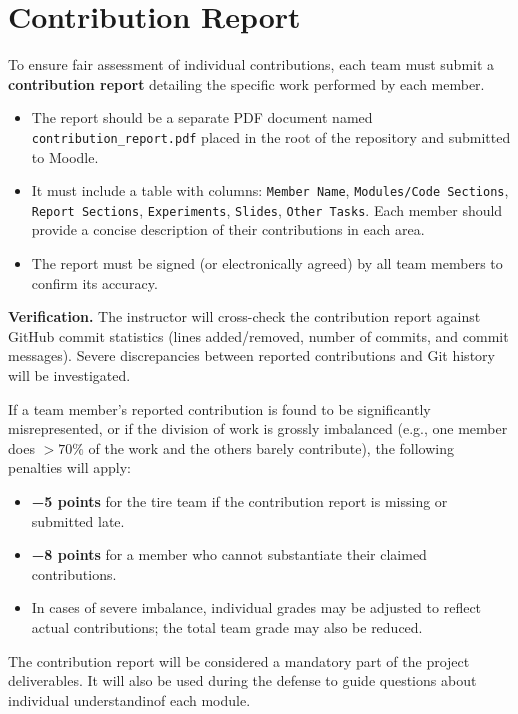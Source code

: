 \documentclass[11pt,a4paper]{article}
\newcommand{\warn}[1]{\textcolor{accent2}{\textbf{#1}}}
\begin{document}
\section{Contribution Report}\label{sec:contribution}
To ensure fair assessment of individual contributions, each team must submit a \textbf{contribution report} detailing the specific work performed by each member.
\begin{itemize}
  \item The report should be a separate PDF document named \texttt{contribution\_report.pdf} placed in the root of the repository and submitted to Moodle.
  \item It must include a table with columns: \texttt{Member Name}, \texttt{Modules/Code Sections}, \texttt{Report Sections}, \texttt{Experiments}, \texttt{Slides}, \texttt{Other Tasks}. Each member should provide a concise description of their contributions in each area.
  \item The report must be signed (or electronically agreed) by all team members to confirm its accuracy.
\end{itemize}
\textbf{Verification.} The instructor will cross-check the contribution report against GitHub commit statistics (lines added/removed, number of commits, and commit messages). Severe discrepancies between reported contributions and Git history will be investigated.
\begin{warnbox}
If a team member's reported contribution is found to be significantly misrepresented, or if the division of work is grossly imbalanced (e.g., one member does $>70\%$ of the work and the others barely contribute), the following penalties will apply:
\begin{itemize}
  \item \warn{−5 points} for the tire team if the contribution report is missing or submitted late.
  \item \warn{−8 points} for a member who cannot substantiate their claimed contributions.
  \item In cases of severe imbalance, individual grades may be adjusted to reflect actual contributions; the total team grade may also be reduced.
\end{itemize}
\end{warnbox}
The contribution report will be considered a mandatory part of the project deliverables. It will also be used during the defense to guide questions about individual understandinof each module.
\end{document}
